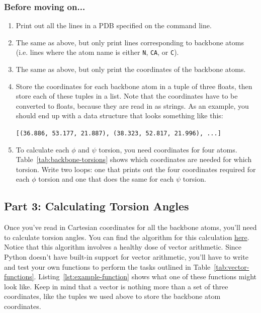 \documentclass{article}
\newcommand{\bbphi}{\ensuremath{\phi}}
\newcommand{\bbpsi}{\ensuremath{\psi}}
\newenvironment{problems}
{\subsubsection{Before moving on...} \begin{enumerate}}
{\end{enumerate}}
\begin{document}
\begin{problems}
 \item Print out all the lines in a PDB specified on the command line.

 \item The same as above, but only print lines corresponding to backbone atoms 
  (i.e. lines where the atom name is either \texttt{N}, \texttt{CA}, or 
  \texttt{C}).

 \item The same as above, but only print the coordinates of the backbone atoms.

 \item Store the coordinates for each backbone atom in a tuple of three floats, 
  then store each of these tuples in a list.  Note that the coordinates have to 
  be converted to floats, because they are read in as strings.  As an example, 
  you should end up with a data structure that looks something like this: 

  \texttt{[(36.886, 53.177, 21.887), (38.323, 52.817, 21.996), ...]}

 \item To calculate each \bbphi{} and \bbpsi{} torsion, you need coordinates 
  for four atoms.  Table~\ref{tab:backbone-torsions} shows which coordinates 
  are needed for which torsion.  Write two loops: one that prints out the four 
  coordinates required for each \bbphi{} torsion and one that does the same for 
  each \bbpsi{} torsion.

\end{problems}

\subsection{Part 3: Calculating Torsion Angles}

Once you've read in Cartesian coordinates for all the backbone atoms, you'll 
need to calculate torsion angles.  You can find the algorithm for this 
calculation 
\href{http://math.stackexchange.com/questions/47059/how-do-i-calculate-a-dihedral-angle-given-cartesian-coordinates}{here}.  
Notice that this algorithm involves a healthy dose of vector arithmetic.  Since 
Python doesn't have built-in support for vector arithmetic, you'll have to 
write and test your own functions to perform the tasks outlined in 
Table~\ref{tab:vector-functions}.  Listing~\ref{lst:example-function} shows 
what one of these functions might look like.  Keep in mind that a vector is 
nothing more than a set of three coordinates, like the tuples we used above to 
store the backbone atom coordinates.  
\end{document}
